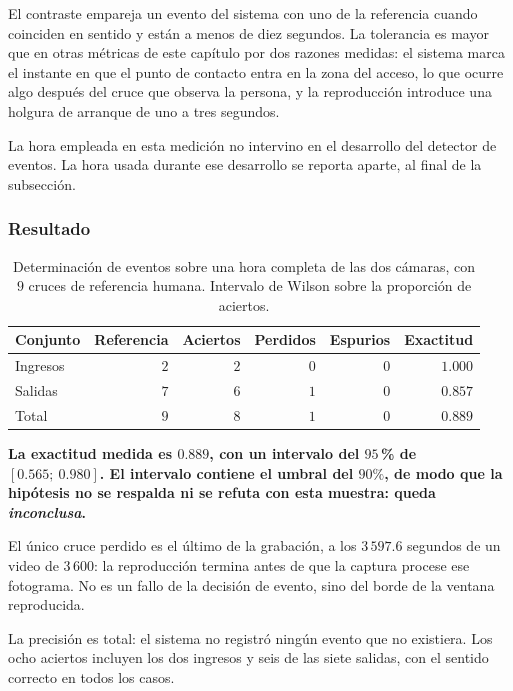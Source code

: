 El contraste empareja un evento del sistema con uno de la referencia cuando
coinciden en sentido y están a menos de diez segundos. La tolerancia es mayor que
en otras métricas de este capítulo por dos razones medidas: el sistema marca el
instante en que el punto de contacto entra en la zona del acceso, lo que ocurre
algo después del cruce que observa la persona, y la reproducción introduce una
holgura de arranque de uno a tres segundos.

La hora empleada en esta medición no intervino en el desarrollo del detector de
eventos. La hora usada durante ese desarrollo se reporta aparte, al final de la
subsección.

\subsubsection{Resultado}

\begin{table}[H]
    \centering
    \caption{Determinación de eventos sobre una hora completa de las dos cámaras,
    con $9$ cruces de referencia humana. Intervalo de Wilson
    \cite{wilson1927probable,brown2001interval} sobre la proporción de aciertos.}
    \label{tab:h15}
    \begin{tabular}{lrrrrr}
        \toprule
        \textbf{Conjunto} & \textbf{Referencia} & \textbf{Aciertos} &
        \textbf{Perdidos} & \textbf{Espurios} & \textbf{Exactitud} \\
        \midrule
        Ingresos & $2$ & $2$ & $0$ & $0$ & $1{.}000$ \\
        Salidas  & $7$ & $6$ & $1$ & $0$ & $0{.}857$ \\
        \midrule
        Total    & $9$ & $8$ & $1$ & $0$ & $0{.}889$ \\
        \bottomrule
    \end{tabular}
\end{table}

\textbf{La exactitud medida es $0{.}889$, con un intervalo del $95$\,\% de
$[0{.}565;\ 0{.}980]$. El intervalo contiene el umbral del $90\%$, de modo que la
hipótesis no se respalda ni se refuta con esta muestra: queda \emph{inconclusa}.}

El único cruce perdido es el último de la grabación, a los $3\,597{.}6$ segundos de
un video de $3\,600$: la reproducción termina antes de que la captura procese ese
fotograma. No es un fallo de la decisión de evento, sino del borde de la ventana
reproducida.

La precisión es total: el sistema no registró ningún evento que no existiera. Los
ocho aciertos incluyen los dos ingresos y seis de las siete salidas, con el sentido
correcto en todos los casos.

